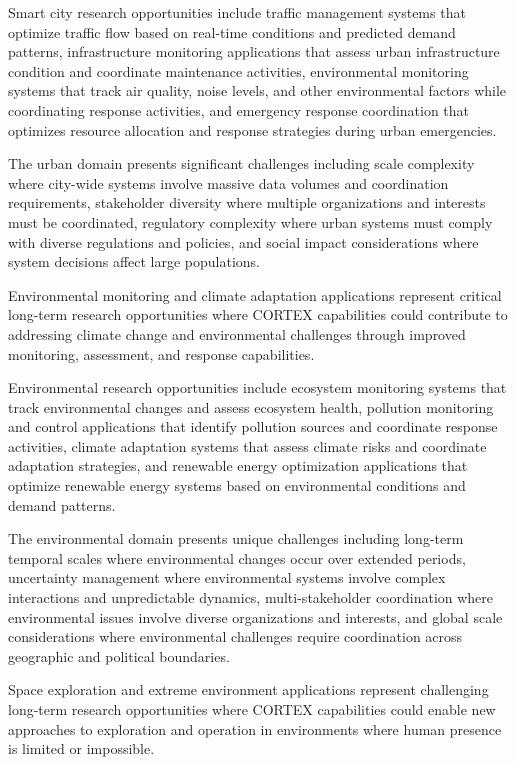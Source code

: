 Smart city research opportunities include traffic management systems that optimize traffic flow based on real-time conditions and predicted demand patterns, infrastructure monitoring applications that assess urban infrastructure condition and coordinate maintenance activities, environmental monitoring systems that track air quality, noise levels, and other environmental factors while coordinating response activities, and emergency response coordination that optimizes resource allocation and response strategies during urban emergencies.

The urban domain presents significant challenges including scale complexity where city-wide systems involve massive data volumes and coordination requirements, stakeholder diversity where multiple organizations and interests must be coordinated, regulatory complexity where urban systems must comply with diverse regulations and policies, and social impact considerations where system decisions affect large populations.

Environmental monitoring and climate adaptation applications represent critical long-term research opportunities where CORTEX capabilities could contribute to addressing climate change and environmental challenges through improved monitoring, assessment, and response capabilities.

Environmental research opportunities include ecosystem monitoring systems that track environmental changes and assess ecosystem health, pollution monitoring and control applications that identify pollution sources and coordinate response activities, climate adaptation systems that assess climate risks and coordinate adaptation strategies, and renewable energy optimization applications that optimize renewable energy systems based on environmental conditions and demand patterns.

The environmental domain presents unique challenges including long-term temporal scales where environmental changes occur over extended periods, uncertainty management where environmental systems involve complex interactions and unpredictable dynamics, multi-stakeholder coordination where environmental issues involve diverse organizations and interests, and global scale considerations where environmental challenges require coordination across geographic and political boundaries.

Space exploration and extreme environment applications represent challenging long-term research opportunities where CORTEX capabilities could enable new approaches to exploration and operation in environments where human presence is limited or impossible.

